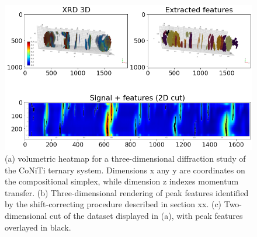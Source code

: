 \documentclass[12pt]{iopart}
\begin{document}
\begin{figure}[h!]
  \centering
    \includegraphics[width=\linewidth]{paper_figures/pkg/6.png}
  \caption{(a) volumetric heatmap for a three-dimensional diffraction
study of the CoNiTi ternary system. Dimensions x any y are coordinates
on the compositional simplex, while dimension z indexes momentum
transfer. (b) Three-dimensional rendering of peak features identified
by the shift-correcting procedure described in section xx. (c)
Two-dimensional cut of the dataset displayed in (a), with peak features
overlayed in black.}
  \label{fig:6}
\end{figure}
\end{document}
